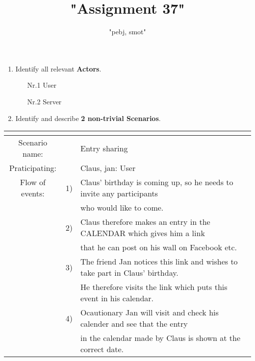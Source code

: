 \documentclass{article}
\begin{document}
	\title{"Assignment 37"}
	\author{"pebj, smot"}
	\maketitle

	\begin{enumerate}
		\item Identify all relevant \textbf{Actors}.
		\begin{enumerate}
			\item[Nr.1] User
			\item[Nr.2] Server
		\end{enumerate}
		\item Identify and describe \textbf{2 non-trivial Scenarios}.
	\end{enumerate}

\begin{tabular}{c r @{} l}
	\multicolumn{2}{c}{} \\
	\hline
	Scenario name:	&&Entry sharing\\
	\hline
	Praticipating:		&&Claus, jan: User \\
	\hline
	Flow of events:	&1)&Claus' birthday is coming up, so he needs to invite any participants\\ 
					&&who would like to come.\\
				&2)&Claus therefore makes an entry in the CALENDAR which gives him a link\\ 
					&&that he can post on his wall on Facebook etc.\\
				&3)&The friend Jan notices this link and wishes to take part in Claus' birthday.\\ 
					&&He therefore visits the link which puts this event in his calendar.\\
				&4)&Ocautionary Jan will visit and check his calender and see that the entry\\ 
					&&in the calendar made by Claus is shown at the correct date. \\
	\hline
\end{tabular}
\\
\end{document}
